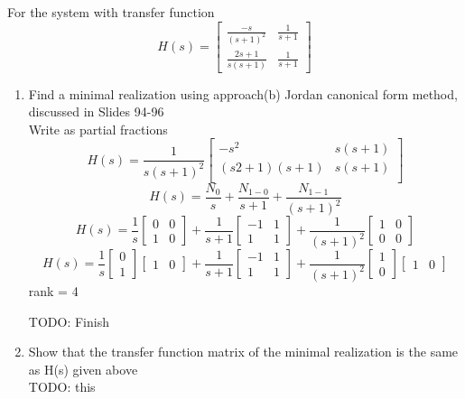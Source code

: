 \item For the system with transfer function 
  \begin{equation}
    H(s) =
    \begin{bmatrix}
      \frac{-s}{(s+1)^2} & \frac 1 {s+1} \\
      \frac {2s+1}{s(s+1)} & \frac 1 {s+1}
    \end{bmatrix}
  \end{equation}
  \begin{enumerate}
  \item Find a minimal realization using approach(b) Jordan canonical form method, discussed in Slides 94-96\\
    Write as partial fractions
    \begin{equation}
      H(s) = \frac 1 {s(s+1)^2}
      \begin{bmatrix}
        -s^2 & s(s+1)\\
        (s2+1)(s+1) & s(s+1)\\ 
      \end{bmatrix}
    \end{equation}
    \begin{equation}
      H(s) =
      \frac{N_0}{s} + \frac {N_{1-0}}{s+1} + \frac {N_{1-1}}{(s+1)^2}
    \end{equation}
    \begin{equation}
      H(s) =
      \frac 1 s
      \begin{bmatrix}
        0 & 0 \\
        1 & 0
      \end{bmatrix} +
      \frac 1 {s+1}
      \begin{bmatrix}
        -1 & 1 \\
        1 & 1
      \end{bmatrix} +
      \frac 1 {(s+1)^2}
      \begin{bmatrix}
        1 & 0 \\
        0 & 0
      \end{bmatrix} 
    \end{equation}
    \begin{equation}
      H(s) =
      \frac 1 s
      \begin{bmatrix}
        0 \\
        1
      \end{bmatrix}
      \begin{bmatrix}
        1 & 0
      \end{bmatrix}+
      \frac 1 {s+1}
      \begin{bmatrix}
        -1 & 1 \\
        1 & 1
      \end{bmatrix} +
      \frac 1 {(s+1)^2}
      \begin{bmatrix}
        1 \\
        0
      \end{bmatrix}
      \begin{bmatrix}
        1 & 0
      \end{bmatrix}
    \end{equation}
    rank = 4
    
    {\LARGE \color{red} TODO: Finish}
  \item Show that the transfer function matrix of the minimal realization is the same as H(s) given above\\
    {\LARGE \color{red} TODO: this}
  \end{enumerate}
